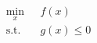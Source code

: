 \documentclass[10pt]{article}
\begin{document}
\begin{align*}\min_x \ \ \ & f(x) \\
\text{s.t. } \ & g(x) \le 0\end{align*}
\end{document}
